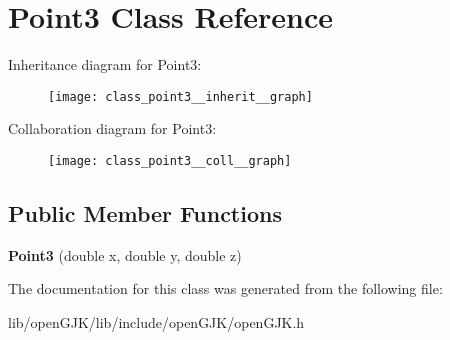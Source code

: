 \hypertarget{class_point3}{}\section{Point3 Class Reference}
\label{class_point3}


Inheritance diagram for Point3\+:\nopagebreak
\begin{figure}[H]
\begin{center}
\leavevmode
\texttt{[image: class\_point3\_\_inherit\_\_graph]}
\end{center}
\end{figure}


Collaboration diagram for Point3\+:\nopagebreak
\begin{figure}[H]
\begin{center}
\leavevmode
\texttt{[image: class\_point3\_\_coll\_\_graph]}
\end{center}
\end{figure}
\subsection*{Public Member Functions}
\begin{DoxyCompactItemize}
\item 
\mbox{\label{class_point3_a2d456f96475506f6eb9053d5c2b1a910}} 
{\bfseries Point3} (double x, double y, double z)
\end{DoxyCompactItemize}


The documentation for this class was generated from the following file\+:\begin{DoxyCompactItemize}
\item 
lib/open\+G\+J\+K/lib/include/open\+G\+J\+K/open\+G\+J\+K.\+h\end{DoxyCompactItemize}
